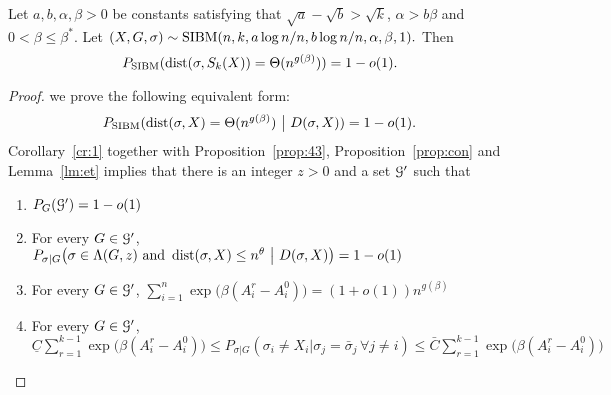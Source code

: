 \documentclass{article}
\begin{document}
\begin{theorem}  \label{thm:dist}
	Let $a,b,\alpha,\beta> 0$ be constants satisfying that
	$\sqrt{a}-\sqrt{b} > \sqrt{k}$, $\alpha>b\beta$ and $0<\beta\le \beta^\ast$.
	Let 
	$
	(X,G,\sigma) \sim \operatorname{SIBM}(n, k, a\log n/n, b\log n/n, \alpha, \beta, 1) .
	$
	Then
	$$
	P_{\operatorname{SIBM}}(\operatorname{dist}(\sigma, S_k(X)) = \Theta(n^{g(\beta)}) ) = 1-o(1) .
	$$
\end{theorem}
\begin{proof}
	we prove the following equivalent form:
	\begin{equation}\label{eq:conditionDist}
	P_{\operatorname{SIBM}}(\operatorname{dist}(\sigma, X) = \Theta(n^{g(\beta)}) ~\big|~ D(\sigma, X) ) = 1-o(1) .
	\end{equation}
	Corollary~\ref{cr:1} together with Proposition~\ref{prop:43}, Proposition~\ref{prop:con} and Lemma~\ref{lm:et}
	implies that there is an integer $z>0$ and a set $\mathcal{G}'$ such that
	\begin{enumerate}[label=\arabic*)]
		\item $P_G(\mathcal{G}') =  1 - o(1)$
		\item For every $G\in\mathcal{G}'$, 
		$
			P_{\sigma|G} \big( \sigma \in  \Lambda(G, z)
			\text{~and~} \operatorname{dist}(\sigma, X) \le n^\theta ~\big|~ D(\sigma, X) \big) 
			=1- o(1)
		$
		\item For every $G\in\mathcal{G}'$, $\sum_{i=1}^n \exp\big(\beta (A^r_i-A^0_i) \big)
		=(1+o(1)) n^{g(\beta)}$
		\item For every $G\in\mathcal{G}'$, $\underline{C}\sum_{r=1}^{k-1}\exp\Big(\beta(A^r_i-A^0_i) \Big)  \le 
		P_{\sigma|G}(\sigma_i \neq  X_i | \sigma_j = \bar{\sigma}_j \,\forall j \neq i )
		\le \bar{C} \sum_{r=1}^{k-1}\exp\Big(\beta (A^r_i-A^0_i ) \Big) $
	\end{enumerate}



\end{proof}
\end{document}
